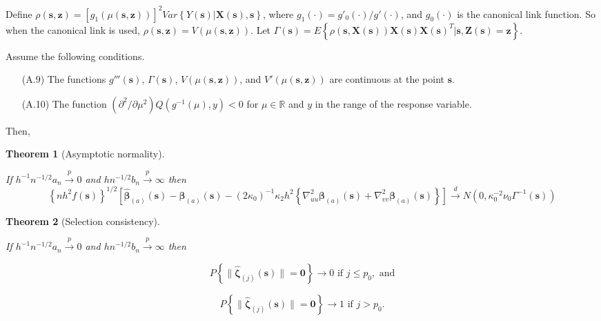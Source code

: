 \documentclass[authoryear,review, 12pt]{elsarticle}
\newtheorem{thm}{Theorem}
\begin{document}
Define $\rho(\bm{s},\bm{z})=\left[g_{1}\left(\mu(\bm{s},\bm{z})\right)\right]^{2}Var\left\{ Y(\bm{s})|\bm{X}(\bm{s}),\bm{s}\right\} $,
where $g_{1}(\cdot)=g'_{0}(\cdot)/g'(\cdot)$, and $g_{0}(\cdot)$
is the canonical link function. So when the canonical link is used,
$\rho(\bm{s},\bm{z})=V\left(\mu(\bm{s},\bm{z})\right)$. Let $\Gamma\left(\bm{s}\right)=E\left\{ \rho\left(\bm{s},\bm{X}(\bm{s})\right)\bm{X}(\bm{s})\bm{X}(\bm{s})^{T}|\bm{s},\bm{Z}(\bm{s})=\bm{z}\right\} $.

Assume the following conditions.
\begin{itemize}
\item[(A.9)] The functions $g'''\left(\bm{s}\right)$, $\Gamma\left(\bm{s}\right)$,
$V\left(\mu\left(\bm{s},\bm{z}\right)\right)$, and $V'\left(\mu\left(\bm{s},\bm{z}\right)\right)$
are continuous at the point $\bm{s}$.
\item[(A.10)] The function $\left(\partial^{2}/\partial\mu^{2}\right)Q\left(g^{-1}\left(\mu\right),y\right)<0$
for $\mu\in\mathbb{R}$ and $y$ in the range of the response variable.
\end{itemize}
Then,
\begin{thm}[Asymptotic normality]
\label{theorem:normality-glm} 



If $h^{-1}n^{-1/2}a_{n}\xrightarrow{p}0$ and $hn^{-1/2}b_{n}\xrightarrow{p}\infty$
then 
\[
\left\{ nh^{2}f(\bm{s})\right\} ^{1/2}\left[\hat{\bm{\beta}}_{(a)}(\bm{s})-\bm{\beta}_{(a)}(\bm{s})-\left(2\kappa_{0}\right)^{-1}\kappa_{2}h^{2}\left\{ \nabla_{uu}^{2}\bm{\beta}_{\left(a\right)}(\bm{s})+\nabla_{vv}^{2}\bm{\beta}_{\left(a\right)}(\bm{s})\right\} \right]\xrightarrow{d}N\left(0,\kappa_{0}^{-2}\nu_{0}\Gamma^{-1}(\bm{s})\right)
\]

\end{thm}

\begin{thm}[Selection consistency]
\label{theorem:selection-glm}



If $h^{-1}n^{-1/2}a_{n}\xrightarrow{p}0$ and $hn^{-1/2}b_{n}\xrightarrow{p}\infty$
then 

\[
P\left\{ \|\hat{\bm{\zeta}}_{(j)}(\bm{s})\|=\bm{0}\right\} \to0\text{ if }j\le p_{0},\text{ and}
\]
 
\[
P\left\{ \|\hat{\bm{\zeta}}_{(j)}(\bm{s})\|=\bm{0}\right\} \to1\text{ if }j>p_{0}.
\]

\end{thm}
\appendix
\end{document}
